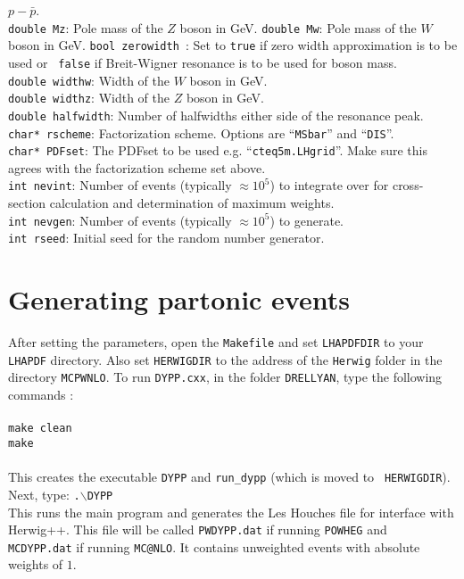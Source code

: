 \documentclass[12pt,a4paper,oneside]{article}
\begin{document}
{$p-\bar{p}$. \\
{\tt double Mz}: Pole mass of the $Z$ boson in GeV.
{\tt double Mw}: Pole mass of the $W$ boson in GeV.
{\tt bool zerowidth }: Set to {\tt true} if zero width approximation is to be used or {\tt
  false} if Breit-Wigner resonance is to be used for boson mass. \\
{\tt double widthw}: Width of the $W$ boson in GeV.\\
{\tt double widthz}: Width of the $Z$ boson in GeV.\\
{\tt double halfwidth}: Number of halfwidths either side of the resonance peak. \\
{\tt char* rscheme}: Factorization scheme. Options are ``{\tt MSbar}'' and ``{\tt DIS}''.\\
{\tt char* PDFset}: The PDFset to be used e.g. ``{\tt cteq5m.LHgrid}''. Make sure this agrees with the factorization
scheme set above. \\
{\tt int nevint}: Number of events (typically $ \approx 10^5$) to integrate over for cross-section calculation and
determination of maximum weights. \\
{\tt int nevgen}: Number of events (typically $\approx 10^5$) to generate. \\
{\tt int rseed}:  Initial seed for the random number generator. \\ 

\section{Generating partonic events}
After setting the parameters, open the {\tt Makefile} and set {\tt LHAPDFDIR} to your
{\tt LHAPDF} directory. Also set {\tt HERWIGDIR} to the address of the {\tt Herwig} folder
in the directory {\tt MCPWNLO}. 
To run {\tt DYPP.cxx}, in the folder {\tt DRELLYAN}, type the following commands :\\
\\
{\tt make clean} \\
{\tt make} \\
\\
This creates the executable {\tt DYPP} and {\tt run\_dypp} (which is moved to {\tt
  HERWIGDIR}). Next, type: 
{\tt .$\backslash$DYPP} \\
This runs the main program and generates the Les Houches file for interface with \textsf{Herwig++}. This file will be called {\tt PWDYPP.dat} if running {\tt POWHEG} and {\tt
  MCDYPP.dat} if running {\tt MC@NLO}. It contains unweighted events with absolute weights
of $1$.
}
\end{document}
